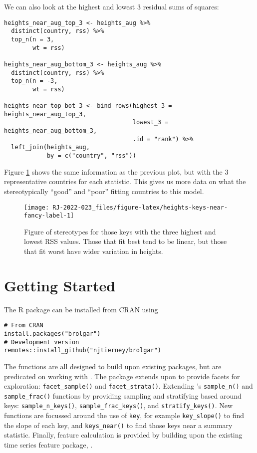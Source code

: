 We can also look at the highest and lowest 3 residual sums of squares:

\begin{verbatim}
heights_near_aug_top_3 <- heights_aug %>% 
  distinct(country, rss) %>% 
  top_n(n = 3,
        wt = rss)

heights_near_aug_bottom_3 <- heights_aug %>% 
  distinct(country, rss) %>% 
  top_n(n = -3,
        wt = rss)

heights_near_top_bot_3 <- bind_rows(highest_3 = heights_near_aug_top_3,
                                    lowest_3 = heights_near_aug_bottom_3,
                                    .id = "rank") %>% 
  left_join(heights_aug,
            by = c("country", "rss"))
\end{verbatim}

Figure \ref{fig:heights-keys-near-fancy-label} shows the same information as the previous plot, but with the 3 representative countries for each statistic. This gives us more data on what the stereotypically ``good'' and ``poor'' fitting countries to this model.

\begin{figure}

{\centering \texttt{[image: RJ-2022-023\_files/figure-latex/heights-keys-near-fancy-label-1]} 

}

\caption{Figure of stereotypes for those keys with the three highest and lowest RSS values. Those that fit best tend to be linear, but those that fit worst have wider variation in heights.}\label{fig:heights-keys-near-fancy-label}
\end{figure}

\hypertarget{getting-started}{%
\section{Getting Started}\label{getting-started}}

The  R package can be installed from CRAN using

\begin{verbatim}
# From CRAN
install.packages("brolgar")
# Development version
remotes::install_github("njtierney/brolgar")
\end{verbatim}

The functions are all designed to build upon existing packages, but are predicated on working with . The package extends upon  to provide facets for exploration: \texttt{facet\_sample()} and \texttt{facet\_strata()}. Extending 's \texttt{sample\_n()} and \texttt{sample\_frac()} functions by providing sampling and stratifying based around keys: \texttt{sample\_n\_keys()}, \texttt{sample\_frac\_keys()}, and \texttt{stratify\_keys()}. New functions are focussed around the use of \texttt{key}, for example \texttt{key\_slope()} to find the slope of each key, and \texttt{keys\_near()} to find those keys near a summary statistic. Finally, feature calculation is provided by building upon the existing time series feature package, .

